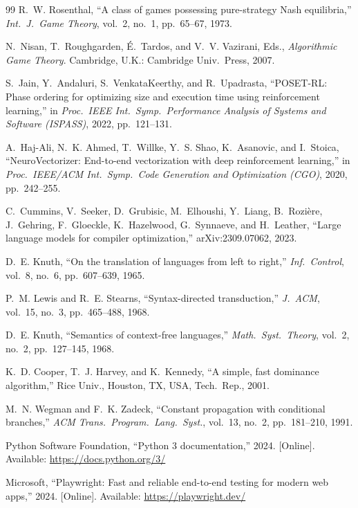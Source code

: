 \documentclass[conference]{IEEEtran}
\begin{document}
\begin{thebibliography}{99}
R.~W. Rosenthal, ``A class of games possessing pure-strategy Nash
equilibria,'' \emph{Int.\ J.\ Game Theory}, vol.~2, no.~1, pp.~65--67,
1973.

N.~Nisan, T.~Roughgarden, {\'E}.~Tardos, and V.~V. Vazirani, Eds.,
\emph{Algorithmic Game Theory}. Cambridge, U.K.: Cambridge Univ.\
Press, 2007.

S.~Jain, Y.~Andaluri, S.~VenkataKeerthy, and R.~Upadrasta, ``POSET-RL:
Phase ordering for optimizing size and execution time using
reinforcement learning,'' in \emph{Proc.\ IEEE Int.\ Symp.\ Performance
Analysis of Systems and Software (ISPASS)}, 2022, pp.~121--131.

A.~Haj-Ali, N.~K. Ahmed, T.~Willke, Y.~S. Shao, K.~Asanovic, and
I.~Stoica, ``NeuroVectorizer: End-to-end vectorization with deep
reinforcement learning,'' in \emph{Proc.\ IEEE/ACM Int.\ Symp.\ Code
Generation and Optimization (CGO)}, 2020, pp.~242--255.

C.~Cummins, V.~Seeker, D.~Grubisic, M.~Elhoushi, Y.~Liang,
B.~Rozi{\`e}re, J.~Gehring, F.~Gloeckle, K.~Hazelwood, G.~Synnaeve, and
H.~Leather, ``Large language models for compiler optimization,''
arXiv:2309.07062, 2023.

D.~E. Knuth, ``On the translation of languages from left to right,''
\emph{Inf.\ Control}, vol.~8, no.~6, pp.~607--639, 1965.

P.~M. Lewis and R.~E. Stearns, ``Syntax-directed transduction,''
\emph{J.~ACM}, vol.~15, no.~3, pp.~465--488, 1968.

D.~E. Knuth, ``Semantics of context-free languages,'' \emph{Math.\
Syst.\ Theory}, vol.~2, no.~2, pp.~127--145, 1968.

K.~D. Cooper, T.~J. Harvey, and K.~Kennedy, ``A simple, fast dominance
algorithm,'' Rice Univ., Houston, TX, USA, Tech.\ Rep., 2001.

M.~N. Wegman and F.~K. Zadeck, ``Constant propagation with conditional
branches,'' \emph{ACM Trans.\ Program.\ Lang.\ Syst.}, vol.~13, no.~2,
pp.~181--210, 1991.

Python Software Foundation, ``Python 3 documentation,'' 2024.
[Online]. Available: \url{https://docs.python.org/3/}

Microsoft, ``Playwright: Fast and reliable end-to-end testing for
modern web apps,'' 2024. [Online]. Available:
\url{https://playwright.dev/}

\end{thebibliography}
\end{document}
